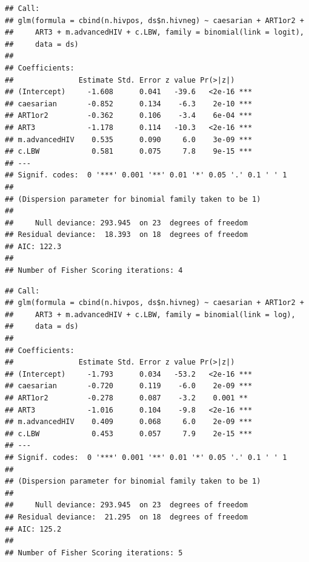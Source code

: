 \documentclass[landscape,twocolumn,letterpaper,9pt,reqno]{article}\usepackage[]{graphicx}\usepackage[]{color}
\newenvironment{knitrout}{}{} %
\begin{document}
\clearpage

\vspace{-0.3in}

\begin{knitrout}\small
{}\color{fgcolor}
\begin{verbatim}
## Call:
## glm(formula = cbind(n.hivpos, ds$n.hivneg) ~ caesarian + ART1or2 + 
##     ART3 + m.advancedHIV + c.LBW, family = binomial(link = logit), 
##     data = ds)
## 
## Coefficients:
##               Estimate Std. Error z value Pr(>|z|)    
## (Intercept)     -1.608      0.041   -39.6   <2e-16 ***
## caesarian       -0.852      0.134    -6.3    2e-10 ***
## ART1or2         -0.362      0.106    -3.4    6e-04 ***
## ART3            -1.178      0.114   -10.3   <2e-16 ***
## m.advancedHIV    0.535      0.090     6.0    3e-09 ***
## c.LBW            0.581      0.075     7.8    9e-15 ***
## ---
## Signif. codes:  0 '***' 0.001 '**' 0.01 '*' 0.05 '.' 0.1 ' ' 1
## 
## (Dispersion parameter for binomial family taken to be 1)
## 
##     Null deviance: 293.945  on 23  degrees of freedom
## Residual deviance:  18.393  on 18  degrees of freedom
## AIC: 122.3
## 
## Number of Fisher Scoring iterations: 4
\end{verbatim}

\end{knitrout}

\vspace{-0.22in}

\begin{knitrout}\small
{}\color{fgcolor}
\begin{verbatim}
## Call:
## glm(formula = cbind(n.hivpos, ds$n.hivneg) ~ caesarian + ART1or2 + 
##     ART3 + m.advancedHIV + c.LBW, family = binomial(link = log), 
##     data = ds)
## 
## Coefficients:
##               Estimate Std. Error z value Pr(>|z|)    
## (Intercept)     -1.793      0.034   -53.2   <2e-16 ***
## caesarian       -0.720      0.119    -6.0    2e-09 ***
## ART1or2         -0.278      0.087    -3.2    0.001 ** 
## ART3            -1.016      0.104    -9.8   <2e-16 ***
## m.advancedHIV    0.409      0.068     6.0    2e-09 ***
## c.LBW            0.453      0.057     7.9    2e-15 ***
## ---
## Signif. codes:  0 '***' 0.001 '**' 0.01 '*' 0.05 '.' 0.1 ' ' 1
## 
## (Dispersion parameter for binomial family taken to be 1)
## 
##     Null deviance: 293.945  on 23  degrees of freedom
## Residual deviance:  21.295  on 18  degrees of freedom
## AIC: 125.2
## 
## Number of Fisher Scoring iterations: 5
\end{verbatim}

\end{knitrout}
\end{document}
